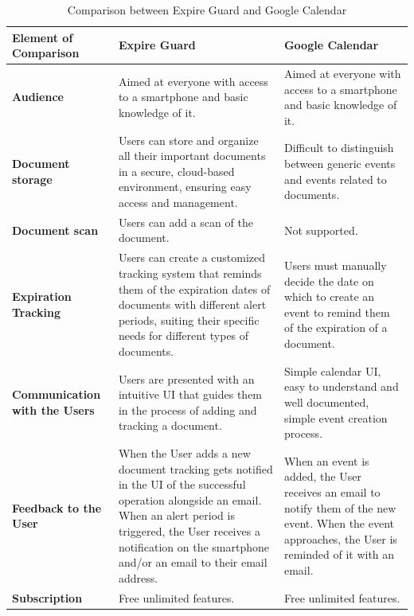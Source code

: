 \begin{table}[H]
	
	\begin{tabularx}{\textwidth}{|X|X|X|}
		\hline
		\textbf{Element of Comparison} & \textbf{Expire Guard} & \textbf{Google Calendar} \\ 
		\hline
		\textbf{Audience} & Aimed at everyone with access to a smartphone and basic knowledge of it. & Aimed at everyone with access to a smartphone and basic knowledge of it. \\
		\hline
		\textbf{Document storage} & Users can store and organize all their important documents in a secure, cloud-based environment, ensuring easy access and management. & Difficult to distinguish between generic events and events related to documents. \\
		\hline
		\textbf{Document scan} & Users can add a scan of the document. & Not supported. \\
		\hline
		\textbf{Expiration Tracking} & Users can create a customized tracking system that reminds them of the expiration dates of documents with different alert periods, suiting their specific needs for different types of documents. & Users must manually decide the date on which to create an event to remind them of the expiration of a document. \\
		\hline
		\textbf{Communication with the Users} & Users are presented with an intuitive UI that guides them in the process of adding and tracking a document. & Simple calendar UI, easy to understand and well documented, simple event creation process. \\
		\hline
		\textbf{Feedback to the User} & When the User adds a new document tracking gets notified in the UI of the successful operation alongside an email. When an alert period is triggered, the User receives a notification on the smartphone and/or an email to their email address. & When an event is added, the User receives an email to notify them of the new event. When the event approaches, the User is reminded of it with an email. \\
		\hline
		\textbf{Subscription} & Free unlimited features. & Free unlimited features. \\
		\hline
	\end{tabularx}
	\caption{Comparison between Expire Guard and Google Calendar}
\end{table}
